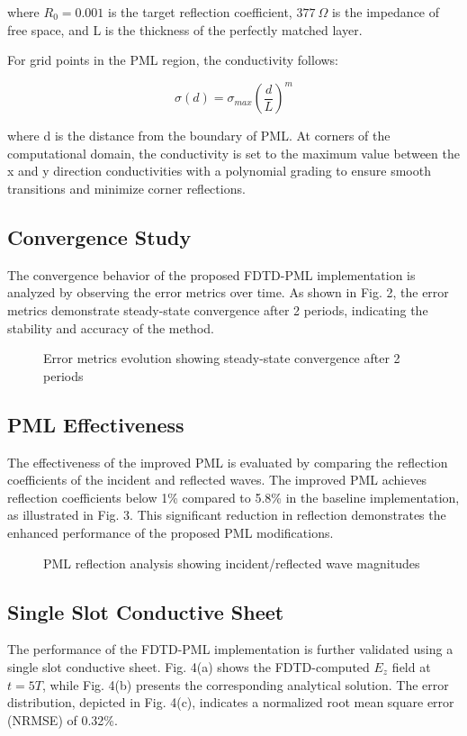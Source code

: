 \documentclass[journal]{IEEEtran}
\begin{document}
where $R_0 = 0.001$ is the target reflection coefficient, $377~\Omega$ is the impedance of free space, 
and L is the thickness of the perfectly matched layer.

For grid points in the PML region, the conductivity follows:

\begin{equation}
\sigma(d) = \sigma_{max} \left(\frac{d}{L}\right)^m
\end{equation}

where d is the distance from the boundary of PML. At corners of the computational domain, the conductivity is set to the maximum value between the x and y direction conductivities with a polynomial grading to ensure smooth transitions and minimize corner reflections.
\subsection{Convergence Study}
The convergence behavior of the proposed FDTD-PML implementation is analyzed by observing the error metrics over time. As shown in Fig. 2, the error metrics demonstrate steady-state convergence after 2 periods, indicating the stability and accuracy of the method.

\begin{figure}[htbp]
\centering
\caption{Error metrics evolution showing steady-state convergence after 2 periods}
\end{figure}

\subsection{PML Effectiveness}
The effectiveness of the improved PML is evaluated by comparing the reflection coefficients of the incident and reflected waves. The improved PML achieves reflection coefficients below 1\% compared to 5.8\% in the baseline implementation, as illustrated in Fig. 3. This significant reduction in reflection demonstrates the enhanced performance of the proposed PML modifications.

\begin{figure}[htbp]
\centering
\caption{PML reflection analysis showing incident/reflected wave magnitudes}
\end{figure}

\subsection{Single Slot Conductive Sheet}
The performance of the FDTD-PML implementation is further validated using a single slot conductive sheet. Fig. 4(a) shows the FDTD-computed $E_z$ field at $t=5T$, while Fig. 4(b) presents the corresponding analytical solution. The error distribution, depicted in Fig. 4(c), indicates a normalized root mean square error (NRMSE) of 0.32\%.
\end{document}
